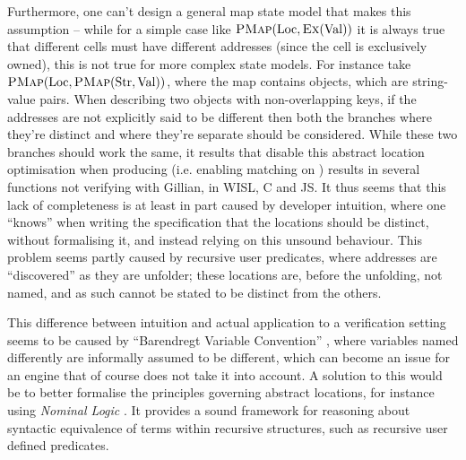 Furthermore, one can't design a general map state model that makes this assumption -- while for a simple case like $\textsc{PMap}(\text{Loc}, \textsc{Ex}(\text{Val}))$ it is always true that different cells must have different addresses (since the cell is exclusively owned), this is not true for more complex state models. For instance take $\textsc{PMap}(\text{Loc}, \textsc{PMap}(\text{Str}, \text{Val}))$, where the map contains objects, which are string-value pairs. When describing two objects with non-overlapping keys, if the addresses are not explicitly said to be different then both the branches where they're distinct and where they're separate should be considered. While these two branches should work the same, it results that disable this abstract location optimisation when producing (i.e. enabling matching on \produce) results in several functions not verifying with Gillian, in WISL, C and JS. It thus seems that this lack of completeness is at least in part caused by developer intuition, where one ``knows'' when writing the specification that the locations should be distinct, without formalising it, and instead relying on this unsound behaviour. This problem seems partly caused by recursive user predicates, where addresses are ``discovered'' as they are unfolder; these locations are, before the unfolding, not named, and as such cannot be stated to be distinct from the others.

This difference between intuition and actual application to a verification setting seems to be caused by ``Barendregt Variable Convention'' \cite{formalbarendregt}, where variables named differently are informally assumed to be different, which can become an issue for an engine that of course does not take it into account. A solution to this would be to better formalise the principles governing abstract locations, for instance using \emph{Nominal Logic} \cite{nominallogic,formalbarendregt}. It provides a sound framework for reasoning about syntactic equivalence of terms within recursive structures, such as recursive user defined predicates.


